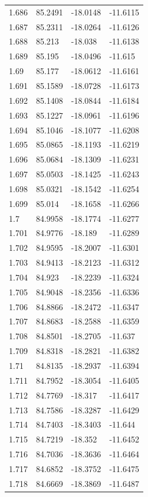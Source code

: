 \begin{tabular}{llll}
1.686 & 85.2491 & -18.0148 & -11.6115 \\
1.687 & 85.2311 & -18.0264 & -11.6126 \\
1.688 & 85.213 & -18.038 & -11.6138 \\
1.689 & 85.195 & -18.0496 & -11.615 \\
1.69 & 85.177 & -18.0612 & -11.6161 \\
1.691 & 85.1589 & -18.0728 & -11.6173 \\
1.692 & 85.1408 & -18.0844 & -11.6184 \\
1.693 & 85.1227 & -18.0961 & -11.6196 \\
1.694 & 85.1046 & -18.1077 & -11.6208 \\
1.695 & 85.0865 & -18.1193 & -11.6219 \\
1.696 & 85.0684 & -18.1309 & -11.6231 \\
1.697 & 85.0503 & -18.1425 & -11.6243 \\
1.698 & 85.0321 & -18.1542 & -11.6254 \\
1.699 & 85.014 & -18.1658 & -11.6266 \\
1.7 & 84.9958 & -18.1774 & -11.6277 \\
1.701 & 84.9776 & -18.189 & -11.6289 \\
1.702 & 84.9595 & -18.2007 & -11.6301 \\
1.703 & 84.9413 & -18.2123 & -11.6312 \\
1.704 & 84.923 & -18.2239 & -11.6324 \\
1.705 & 84.9048 & -18.2356 & -11.6336 \\
1.706 & 84.8866 & -18.2472 & -11.6347 \\
1.707 & 84.8683 & -18.2588 & -11.6359 \\
1.708 & 84.8501 & -18.2705 & -11.637 \\
1.709 & 84.8318 & -18.2821 & -11.6382 \\
1.71 & 84.8135 & -18.2937 & -11.6394 \\
1.711 & 84.7952 & -18.3054 & -11.6405 \\
1.712 & 84.7769 & -18.317 & -11.6417 \\
1.713 & 84.7586 & -18.3287 & -11.6429 \\
1.714 & 84.7403 & -18.3403 & -11.644 \\
1.715 & 84.7219 & -18.352 & -11.6452 \\
1.716 & 84.7036 & -18.3636 & -11.6464 \\
1.717 & 84.6852 & -18.3752 & -11.6475 \\
1.718 & 84.6669 & -18.3869 & -11.6487 \\

\end{tabular}
